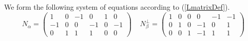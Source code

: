 We form the following system of equations according to (\ref{LmatrixDef}).
\[
N_\alpha=
\left(\begin{array}{cc|cccc}
1 & 0 & -1 & 0 & 1 & 0 \\
-1 & 0 & 0 & -1 & 0 & -1 \\
0 & 1 & 1 & 1 & 0 & 0
\end{array}\right)
\;\;\;\;
N_\beta^\perp =
\left(\begin{array}{cc|cccc}
1 & 0 & 0 & 0 & -1 & -1 \\
0 & 1 & 0 & -1 & 0 & 1 \\
0 & 0 & 1 & -1 & 1 & 1
\end{array}\right)
\]




